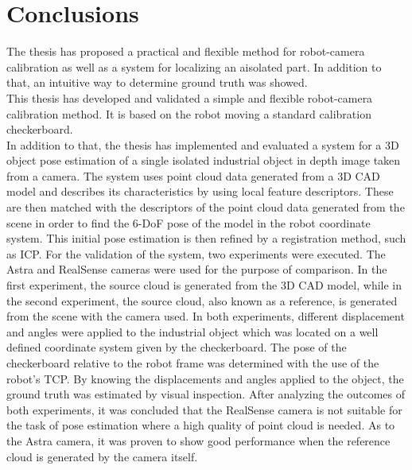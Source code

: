 \chapter{Conclusions}
\label{chap:con}


The thesis has proposed a practical and flexible method for robot-camera calibration as well as a system for localizing an aisolated part. In addition to that, an intuitive way to determine ground truth was showed.\\

This thesis has developed and validated a simple and flexible robot-camera calibration method. It is based on the robot moving a standard calibration checkerboard. \\



In addition to that, the thesis has implemented and evaluated a system for a 3D object pose estimation of a single isolated industrial object in depth image taken from a camera. The system uses point cloud data generated from a 3D CAD model and describes its characteristics by using local feature descriptors. These are then matched with the descriptors of the point cloud data generated from the scene in order to find the 6-DoF pose of the model in the robot coordinate system. This initial pose estimation is then refined by a registration method, such as ICP.  For the validation of the system, two experiments were executed. The Astra and RealSense cameras were used for the purpose of comparison. In the first experiment,  the source cloud is generated from the 3D CAD model, while in the second experiment, the source cloud, also known as a reference, is generated from the scene with the camera used. In both experiments, different displacement and angles were applied to the industrial object which was located on a well defined coordinate system given by the checkerboard. The pose of the checkerboard relative to the robot frame was determined with the use of the robot's TCP. By knowing the displacements and angles applied to the object, the ground truth was estimated by visual inspection.  After analyzing the outcomes of both experiments, it was concluded that the RealSense camera is not suitable for the task of pose estimation where a high quality of point cloud is needed. As to the Astra camera, it was proven to show good performance when the reference cloud is generated by the camera itself. \\





\iffalse
A robot-camera calibration is performed also.
The contributions of this thesis are as follows: The system uses FPFH (Fast Point Feature Histogram) for describing the local region and a hypothesize-and-test paradigm, e.g. RANSAC in the matching process. In contrast to several approaches those whose rely on Point Pair Features as feature descriptors and a geometry hashing, e.g. voting-scheme as the matching process.
\fi